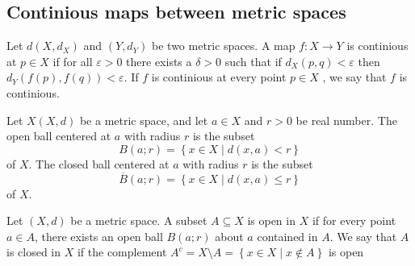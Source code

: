 \documentclass{article}
\theoremstyle{remark}
\begin{document}
\subsection{Continious maps between metric spaces}%
\label{sub:continious_maps_between_spaces}

\begin{definition}
    Let $d\left( X, d_{X} \right)$ and $\left( Y, d_{Y} \right)$ be two metric spaces. A map $f: X\to Y$ is continious
    at $p \in X$ if for all $\varepsilon > 0$  there exists a $\delta > 0 $ such that if $d_{X}\left( p,q \right) <
    \varepsilon $ then $d_{Y}\left( f\left( p \right), f\left( q \right) \right) < \varepsilon $.
    If $f$  is continious at every point $p \in  X$ , we say that $f$ is continious.
\end{definition}



\begin{definition}
    Let $X\left( X,d \right)$ be a metric space, and let $a \in X$ and $r >0$ be real number. The open ball centered at
    $a$ with radius $r$  is the subset \[
        B\left( a;r \right) = \left\{ x \in X  \mid  d\left( x,a \right) < r \right\}
    \]
    of $X$. The closed ball centered at $a$ with radius $r$ is the subset \[
    \overline{B} \left( a;r \right) = \left\{ x \in X  \mid  d\left( x,a \right) \le r \right\}
    \]
    of $X$.

\end{definition}


\begin{definition}
    Let $\left( X,d \right)$ be a metric space. A subset $A \subseteq X$ is open in $X$ if for every point $a \in A$,
    there exists an open ball $B\left( a;r \right)$ about $a$ contained in $A$. We say that $A$ is closed in $X$ if the
    complement $A^{c} = X \setminus A = \left\{ x \in X  \mid  x \not\in A  \right\}$ is open
\end{definition}





\end{document}
